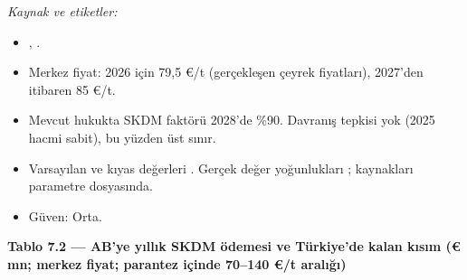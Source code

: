 \endgroup

\emph{Kaynak ve etiketler:}

\begin{itemize}
\tightlist
\item
  \etiketT{} , .
\item
  Merkez fiyat: 2026 için 79,5 €/t (gerçekleşen çeyrek fiyatları), 2027'den itibaren 85 €/t.
\item
  Mevcut hukukta SKDM faktörü 2028'de \%90. Davranış tepkisi yok (2025 hacmi sabit), bu yüzden üst sınır.
\item
  Varsayılan ve kıyas değerleri \etiketV{}. Gerçek değer yoğunlukları \etiketH{}; kaynakları parametre dosyasında.
\item
  Güven: Orta.
\end{itemize}


\textbf{Tablo 7.2 --- AB'ye yıllık SKDM ödemesi ve Türkiye'de kalan kısım (€ mn; merkez fiyat; parantez içinde 70--140 €/t aralığı)}

\nopagebreak[4]

\begingroup\gbtablo\footnotesize

